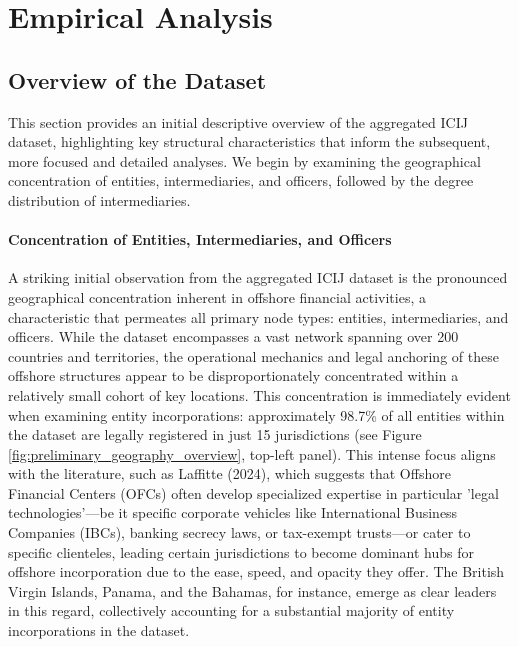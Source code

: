 \chapter{Empirical Analysis}
\label{chap:empirical_analysis}

\section{Overview of the Dataset}
\label{subsec:overview_dataset}
This section provides an initial descriptive overview of the aggregated ICIJ dataset, highlighting key structural characteristics that inform the subsequent, more focused and detailed analyses. We begin by examining the geographical concentration of entities, intermediaries, and officers, followed by the degree distribution of intermediaries.

\subsubsection{Concentration of Entities, Intermediaries, and Officers}

\label{subsubsec:concentration_elements}
A striking initial observation from the aggregated ICIJ dataset is the pronounced geographical concentration inherent in offshore financial activities, a characteristic that permeates all primary node types: entities, intermediaries, and officers. While the dataset encompasses a vast network spanning over 200 countries and territories, the operational mechanics and legal anchoring of these offshore structures appear to be disproportionately concentrated within a relatively small cohort of key locations. This concentration is immediately evident when examining entity incorporations: approximately 98.7\% of all entities within the dataset are legally registered in just 15 jurisdictions (see Figure \ref{fig:preliminary_geography_overview}, top-left panel). This intense focus aligns with the literature, such as Laffitte (2024), which suggests that Offshore Financial Centers (OFCs) often develop specialized expertise in particular 'legal technologies'—be it specific corporate vehicles like International Business Companies (IBCs), banking secrecy laws, or tax-exempt trusts—or cater to specific clienteles, leading certain jurisdictions to become dominant hubs for offshore incorporation due to the ease, speed, and opacity they offer. The British Virgin Islands, Panama, and the Bahamas, for instance, emerge as clear leaders in this regard, collectively accounting for a substantial majority of entity incorporations in the dataset.

